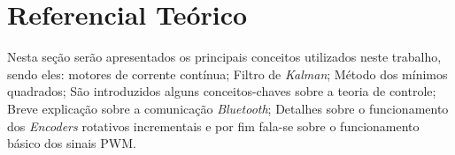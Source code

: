 \chapter[Referencial Teórico]{Referencial Teórico}
\label{ch:referencial_teorico}

Nesta seção serão apresentados os principais conceitos utilizados neste trabalho, sendo eles: motores de corrente contínua; Filtro de \emph{Kalman}; Método dos mínimos quadrados; São introduzidos alguns conceitos-chaves sobre a teoria de controle; Breve explicação sobre a comunicação \emph{Bluetooth}; Detalhes sobre o funcionamento dos \emph{Encoders} rotativos incrementais e por fim fala-se sobre o funcionamento básico dos sinais PWM.







